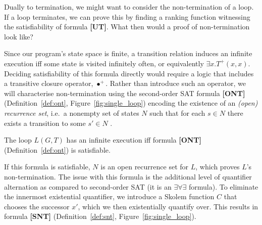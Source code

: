 \documentclass[a4paper]{llncs}
\begin{document}
Dually to termination, we might want to consider the non-termination of a loop.  If a loop terminates,
we can prove this by finding a ranking function %
witnessing the satisfiability of formula {\bf[UT]}.  What then would a proof of non-termination look like?

Since our program's state space is finite, a transition relation
induces an infinite execution iff some state is visited infinitely
often, or equivalently $ \exists x . T^+(x, x)$.
Deciding satisfiability of this formula directly would require a logic
that includes a transitive closure operator, $\bullet^+$.  Rather than
introduce such an operator, we will characterise non-termination
using the second-order SAT formula {\bf [ONT]} (Definition~\ref{def:ont}, Figure~\ref{fig:single_loop})
encoding the existence of an \emph{(open) recurrence set}, i.e.~a nonempty 
set of states $N$ such that for each $s \in N$ there
exists a transition to some $s' \in N$ \cite{DBLP:conf/popl/GuptaHMRX08}.

\begin{theorem}
\label{thm:ont}
 The loop $L(G, T)$ has an infinite execution iff formula {\bf [ONT]} (Definition~\ref{def:ont}) is satisfiable.
\end{theorem}

%  

If this formula is satisfiable, $N$ is an open recurrence set for $L$, which proves
$L$'s non-termination. The issue with this formula is the additional level of quantifier alternation as compared to second-order SAT
(it is an $\exists \forall \exists$ formula).  To eliminate the innermost existential quantifier,
we introduce a Skolem function $C$ that chooses the successor $x'$, which we then existentially quantify over.
This results in formula {\bf [SNT]} (Definition~\ref{def:snt}, Figure~\ref{fig:single_loop}).
\end{document}
